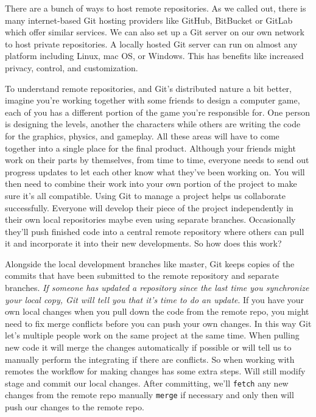 	There are a bunch of ways to host remote repositories. As we called out, there is many internet-based Git hosting providers like GitHub, BitBucket or GitLab which offer similar services. We can also set up a Git server on our own network to host private repositories. 
	A locally hosted Git server can run on almost any platform including Linux, mac OS, or Windows. This has benefits like increased privacy, control, and customization. 
	
	To understand remote repositories, and Git's distributed nature a bit better, imagine you're working together with some friends to design a computer game, each of you has a different portion of the game you're responsible for. 
	One person is designing the levels, another the characters while others are writing the code for the graphics, physics, and gameplay. 
	All these areas will have to come together into a single place for the final product. Although your friends might work on their parts by themselves, from time to time, everyone needs to send out progress updates to let each other know what they've been working on. You will then need to combine their work into your own portion of the project to make sure it's all compatible. Using Git to manage a project helps us collaborate successfully. 
	Everyone will develop their piece of the project independently in their own local repositories maybe even using separate branches. Occasionally they'll push finished code into a central remote repository where others can pull it and incorporate it into their new developments. So how does this work? 
	
	Alongside the local development branches like master, Git keeps copies of the commits that have been submitted to the remote repository and separate branches. 
	\textit{If someone has updated a repository since the last time you synchronize your local copy, Git will tell you that it's time to do an update}. 
	If you have your own local changes when you pull down the code from the remote repo, you might need to fix merge conflicts before you can push your own changes. 
	In this way Git let's multiple people work on the same project at the same time. When pulling new code it will merge the changes automatically if possible or will tell us to manually perform the integrating if there are conflicts. 
	So when working with remotes the workflow for making changes has some extra steps. 
	Will still modify stage and commit our local changes. After committing, we'll \texttt{fetch} any new changes from the remote repo manually \texttt{merge} if necessary and only then will push our changes to the remote repo. 
	
